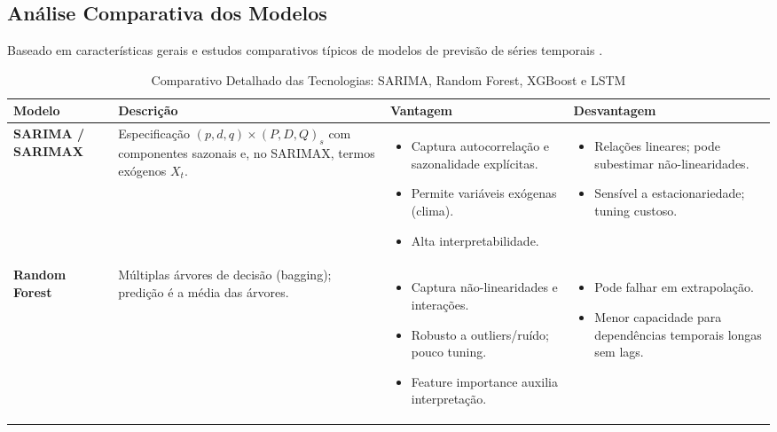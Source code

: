 \subsection{Análise Comparativa dos Modelos}

Baseado em características gerais e estudos comparativos típicos de modelos de previsão de séries temporais \cite{aiyegbeni2024comparative}.

\begin{table}[!ht]
    \centering
    \small
    \caption{Comparativo Detalhado das Tecnologias: SARIMA, Random Forest, XGBoost e LSTM}
    \label{tab:comparativo_detalhado_tecnologias}
    \setlength{\tabcolsep}{3pt} %
    \begin{tabular}{|p{}|p{}|p{}|p{}|}
    \hline
    \textbf{Modelo} & \textbf{Descrição} & \textbf{Vantagem} & \textbf{Desvantagem} \\ \hline
    \textbf{SARIMA / SARIMAX} & Especificação $(p,d,q)\times(P,D,Q)_s$ com componentes sazonais e, no SARIMAX, termos exógenos $X_t$. & \begin{itemize}[leftmargin=*,noitemsep,topsep=0pt] \item Captura autocorrelação e sazonalidade explícitas. \item Permite variáveis exógenas (clima). \item Alta interpretabilidade. \end{itemize} & \begin{itemize}[leftmargin=*,noitemsep,topsep=0pt] \item Relações lineares; pode subestimar não-linearidades. \item Sensível a estacionariedade; tuning custoso. \end{itemize} \\ \hline
    \textbf{Random Forest} & Múltiplas árvores de decisão (bagging); predição é a média das árvores. & \begin{itemize}[leftmargin=*,noitemsep,topsep=0pt] \item Captura não-linearidades e interações. \item Robusto a outliers/ruído; pouco tuning. \item Feature importance auxilia interpretação. \end{itemize} & \begin{itemize}[leftmargin=*,noitemsep,topsep=0pt] \item Pode falhar em extrapolação. \item Menor capacidade para dependências temporais longas sem lags. \end{itemize} \\ \hline

\end{tabular}
\end{table}
